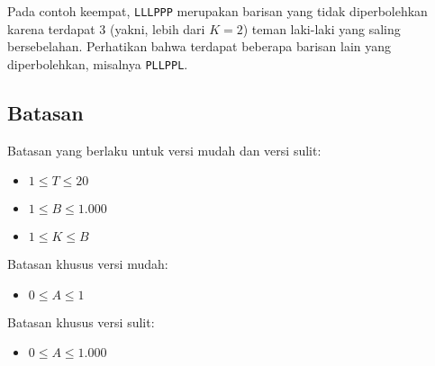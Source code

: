 \documentclass[../main_problemset.tex]{subfiles} %
\begin{document}
Pada contoh keempat, \texttt{LLLPPP} merupakan barisan yang tidak diperbolehkan karena terdapat 3 (yakni, lebih dari $ K=2 $) teman laki-laki yang saling bersebelahan. Perhatikan bahwa terdapat beberapa barisan lain yang diperbolehkan, misalnya \texttt{PLLPPL}.

\pagebreak
\subsection*{Batasan}

\begin{minipage}[t]{0.47\textwidth}

Batasan yang berlaku untuk versi mudah dan versi sulit:

\begin{itemize}
	\item $ 1 \le T \le 20 $
	\item $ 1 \le B \le 1.000 $
	\item $ 1 \le K \le B $
\end{itemize}
\end{minipage}
\begin{minipage}[t]{0.06\textwidth}
    \hfill
\end{minipage}
\begin{minipage}[t]{0.47\textwidth}
Batasan khusus versi mudah:

\begin{itemize}
	\item $0 \le A \le 1$
\end{itemize}

\vspace{.2cm}

Batasan khusus versi sulit:

\begin{itemize}
	\item $0 \le A \le 1.000$
\end{itemize}
\end{minipage}
\end{document}
